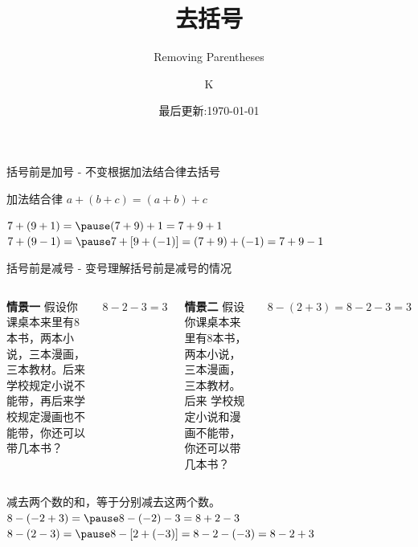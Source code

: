 \documentclass{beamer}
\title{去括号}
\subtitle{Removing Parentheses}
\author{K}
\date{最后更新:\today}
\begin{document}
    \frame{\titlepage}

    \begin{frame}{括号前是加号 - 不变}{根据加法结合律去括号}
        \begin{alertblock}{加法结合律}
            $a + (b+c) = (a+b) +c$
        \end{alertblock}
        \begin{block}{}
            $ 7 + (9 + 1) =  \pause (7 + 9 ) +1 = 7 + 9 + 1 $
            $ 7 + (9 - 1) =  \pause 7 + [9 + (- 1)] = (7+9)+(-1)=7+9-1$
        \end{block}
        
    \end{frame}
    \begin{frame}{括号前是减号 - 变号}{理解括号前是减号的情况}
        \begin{columns}[t]
            \textbf{情景一} \quad 假设你课桌本来里有8本书，两本小说，三本漫画，三本教材。后来
            学校规定小说不能带，再后来学校规定漫画也不能带，你还可以带几本书？

            \begin{block}{}
               $ 8 - 2 - 3 = 3$
            \end{block}

            \textbf{情景二} \quad 假设你课桌本来里有8本书，两本小说，三本漫画，三本教材。后来
            学校规定小说和漫画不能带，你还可以带几本书？

            \begin{block}{}
                $8 - (2 + 3) = 8 - 2 - 3 = 3$
            \end{block}
        \end{columns}
        
        \vspace{5pt}
        
        \begin{block}{减去两个数的和，等于分别减去这两个数。}
        $8 - (-2 + 3) = \pause 8 -(-2)- 3 = 8 +2-3$\\
        $8 - (2-3) = \pause 8 - [2+(-3)]= 8- 2 - (-3)= 8 -2 + 3$
        \end{block}
    \end{frame}
\end{document}
